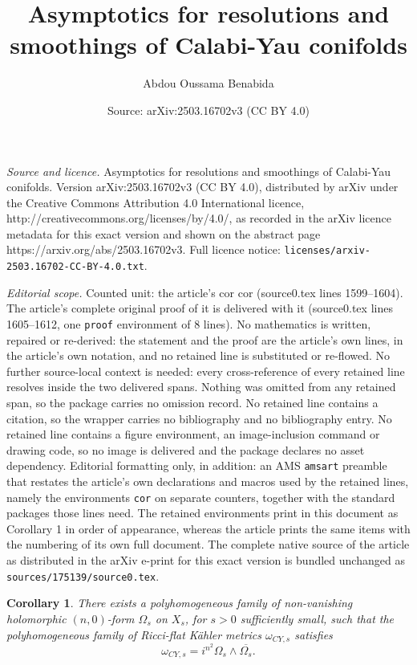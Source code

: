 \documentclass[10pt,a4paper]{amsart}
\title{Asymptotics for resolutions and smoothings of Calabi-Yau conifolds}
\author{Abdou Oussama Benabida}
\date{Source: arXiv:2503.16702v3 (CC BY 4.0)}
\newtheorem{cor}{Corollary}
\begin{document}
\maketitle

\noindent\emph{Source and licence.} Asymptotics for resolutions and smoothings of Calabi-Yau conifolds. Version arXiv:2503.16702v3 (CC BY 4.0), distributed by arXiv under the Creative Commons Attribution 4.0 International licence, http://creativecommons.org/licenses/by/4.0/, as recorded in the arXiv licence metadata for this exact version and shown on the abstract page https://arxiv.org/abs/2503.16702v3. Full licence notice: \texttt{licenses/arxiv-2503.16702-CC-BY-4.0.txt}.\par\smallskip

\noindent\textit{Editorial scope.} Counted unit: the article's cor cor (source0.tex lines 1599--1604). The article's complete original proof of it is delivered with it (source0.tex lines 1605--1612, one \texttt{proof} environment of 8 lines). No mathematics is written, repaired or re-derived: the statement and the proof are the article's own lines, in the article's own notation, and no retained line is substituted or re-flowed.  No further source-local context is needed: every cross-reference of every retained line resolves inside the two delivered spans.  Nothing was omitted from any retained span, so the package carries no omission record.  No retained line contains a citation, so the wrapper carries no bibliography and no bibliography entry.  No retained line contains a figure environment, an image-inclusion command or drawing code, so no image is delivered and the package declares no asset dependency.  Editorial formatting only, in addition: an AMS \texttt{amsart} preamble that restates the article's own declarations and macros used by the retained lines, namely the environments \texttt{cor} on separate counters, together with the standard packages those lines need.  The retained environments print in this document as Corollary 1 in order of appearance, whereas the article prints the same items with the numbering of its own full document.  The complete native source of the article as distributed in the arXiv e-print for this exact version is bundled unchanged as \texttt{sources/175139/source0.tex}.
\begin{cor}
    There exists a polyhomogeneous family of non-vanishing holomorphic $(n,0)$-form $\Omega_s$ on $X_s$, for $s>0$ sufficiently small, such that the polyhomogeneous family of Ricci-flat Kähler metrics $\omega_{CY,s}$ satisfies
    $$
    \omega_{CY,s} = i^{n^2} \Omega_s \wedge \overline{\Omega_s}.
    $$
\end{cor}
\end{document}
